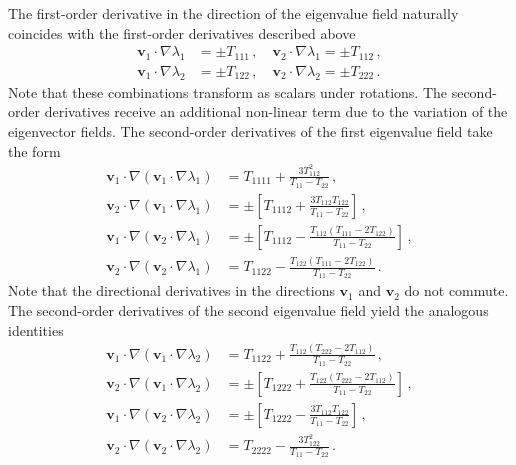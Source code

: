 \documentclass[a4paper, 11pt]{article}
\begin{document}
The first-order derivative in the direction of the eigenvalue field naturally coincides with the first-order derivatives described above
\begin{align}
\bm{v}_1 \cdot \nabla \lambda_1 &= \pm T_{111}\,,\quad
\bm{v}_2 \cdot \nabla \lambda_1 = \pm T_{112}\,,\\
\bm{v}_1 \cdot \nabla \lambda_2 &= \pm T_{122}\,,\quad
\bm{v}_2 \cdot \nabla \lambda_2 = \pm T_{222}\,.
\end{align}
Note that these combinations transform as scalars under rotations. The second-order derivatives receive an additional non-linear term due to the variation of the eigenvector fields. The second-order derivatives of the first eigenvalue field take the form
\begin{align}
\bm{v}_1 \cdot \nabla (\bm{v}_1 \cdot \nabla \lambda_1) &= T_{1111} + \frac{3T_{112}^2}{T_{11}-T_{22}}\,,\\
\bm{v}_2 \cdot \nabla (\bm{v}_1 \cdot \nabla \lambda_1) &= \pm \left[T_{1112} + \frac{3T_{112}T_{122}}{T_{11}-T_{22}}\right]\,,\\
\bm{v}_1 \cdot \nabla (\bm{v}_2 \cdot \nabla \lambda_1) &= \pm \left[T_{1112} - \frac{T_{112}(T_{111}-2T_{122})}{T_{11}-T_{22}}\right]\,,\\
\bm{v}_2 \cdot \nabla (\bm{v}_2 \cdot \nabla \lambda_1) &= T_{1122} - \frac{T_{122}(T_{111}-2T_{122})}{T_{11}-T_{22}}\,.
\end{align}
Note that the directional derivatives in the directions $\bm{v}_1$ and $\bm{v}_2$ do not commute. The second-order derivatives of the second eigenvalue field yield the analogous identities
\begin{align}
\bm{v}_1 \cdot \nabla (\bm{v}_1 \cdot \nabla \lambda_2) &= T_{1122} + \frac{T_{112}(T_{222}-2T_{112})}{T_{11}-T_{22}}\,,\\
\bm{v}_2 \cdot \nabla (\bm{v}_1 \cdot \nabla \lambda_2) &= \pm\left[T_{1222} + \frac{T_{122}(T_{222}-2T_{112})}{T_{11}-T_{22}}\right]\,,\\
\bm{v}_1 \cdot \nabla (\bm{v}_2 \cdot \nabla \lambda_2) &= \pm\left[T_{1222} - \frac{3T_{112}T_{122}}{T_{11}-T_{22}}\right]\,,\\
\bm{v}_2 \cdot \nabla (\bm{v}_2 \cdot \nabla \lambda_2) &= T_{2222} - \frac{3T_{122}^2}{T_{11}-T_{22}}\,.
\end{align}

\end{document}
